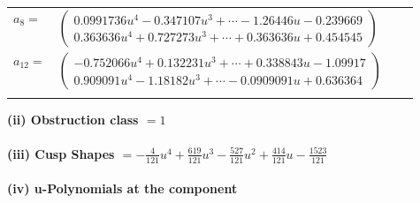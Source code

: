\documentclass[1p]{elsarticle_modified}
\theoremstyle{definition}
\begin{document}
\begin{tabular}{m{7pt} m{180pt} m{7pt} m{180pt} }
\flushright $a_{8}=$&$\begin{pmatrix}0.0991736 u^{4}-0.347107 u^{3}+\cdots-1.26446 u-0.239669\\0.363636 u^{4}+0.727273 u^{3}+\cdots+0.363636 u+0.454545\end{pmatrix}$ \\
\flushright $a_{12}=$&$\begin{pmatrix}-0.752066 u^{4}+0.132231 u^{3}+\cdots+0.338843 u-1.09917\\0.909091 u^{4}-1.18182 u^{3}+\cdots-0.0909091 u+0.636364\end{pmatrix}$\\&\end{tabular}
\flushleft \textbf{(ii) Obstruction class $= 1$}\\~\\
\flushleft \textbf{(iii) Cusp Shapes $= -\frac{4}{121} u^4+\frac{619}{121} u^3-\frac{527}{121} u^2+\frac{414}{121} u-\frac{1523}{121}$}\\~\\
\newpage\renewcommand{\arraystretch}{1}
\flushleft \textbf{(iv) u-Polynomials at the component}\newline \\
\end{document}
